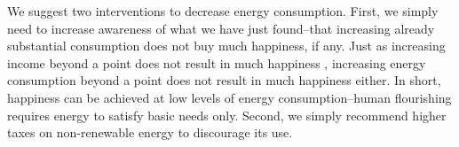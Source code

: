 \documentclass[10pt, letterpaper]{article}
\begin{document}
\begin{spacing}{1.4}
%
%
%
We suggest two interventions to decrease energy consumption. First, we simply
need to increase awareness of what we have just found--that increasing
already substantial consumption does not buy much happiness, if any. Just as increasing  income
 beyond a point does not result in much happiness \cite{kahneman10}, increasing
 energy consumption beyond a point does not result in much happiness
 either. %
  In short, happiness can be achieved at low
 levels of energy consumption--human flourishing requires energy to satisfy
 basic needs only. Second, we simply recommend higher taxes on non-renewable
 energy to discourage its use. 


\end{spacing}
\end{document}
